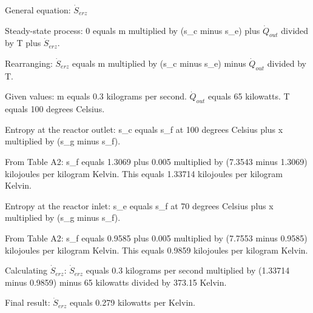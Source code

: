 General equation: \( \dot{S}_{erz} \)  

Steady-state process:  
0 equals m multiplied by (s_c minus s_e) plus \( \dot{Q}_{out} \) divided by T plus \( \dot{S}_{erz} \).  

Rearranging:  
\( \dot{S}_{erz} \) equals m multiplied by (s_c minus s_e) minus \( \dot{Q}_{out} \) divided by T.  

Given values:  
m equals 0.3 kilograms per second.  
\( \dot{Q}_{out} \) equals 65 kilowatts.  
T equals 100 degrees Celsius.  

Entropy at the reactor outlet:  
s_c equals s_f at 100 degrees Celsius plus x multiplied by (s_g minus s_f).  

From Table A2:  
s_f equals 1.3069 plus 0.005 multiplied by (7.3543 minus 1.3069) kilojoules per kilogram Kelvin.  
This equals 1.33714 kilojoules per kilogram Kelvin.  

Entropy at the reactor inlet:  
s_e equals s_f at 70 degrees Celsius plus x multiplied by (s_g minus s_f).  

From Table A2:  
s_f equals 0.9585 plus 0.005 multiplied by (7.7553 minus 0.9585) kilojoules per kilogram Kelvin.  
This equals 0.9859 kilojoules per kilogram Kelvin.  

Calculating \( \dot{S}_{erz} \):  
\( \dot{S}_{erz} \) equals 0.3 kilograms per second multiplied by (1.33714 minus 0.9859) minus 65 kilowatts divided by 373.15 Kelvin.  

Final result:  
\( \dot{S}_{erz} \) equals 0.279 kilowatts per Kelvin.